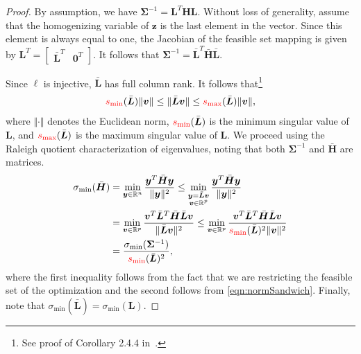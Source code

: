 \documentclass[lettersize,journal]{IEEEtran}
\newcommand{\rev}[1]{\color{red}{#1}\color{black}}
\begin{document}
\begin{proof}
By assumption, we have $\bm{\Sigma}^{-1} = \bm{L}^T\bm{H}\bm{L}$. Without loss of generality, assume that the homogenizing variable of $\bm{z}$ is the last element in the vector. Since this element is always equal to one, the Jacobian of the feasible set mapping is given by $\bm{L}^T = \begin{bmatrix}
	\bar{\bm{L}}^T & \bm{0}^T
\end{bmatrix}$. It follows that $\bm{\Sigma}^{-1} = \bar{\bm{L}}^T\bar{\bm{H}}\bar{\bm{L}}$.

Since $\bm{\ell}$ is injective, $\bar{\bm{L}}$ has full column rank. It follows that\footnote{See proof of Corollary 2.4.4 in~\cite{golubMatrixComputations2013}.}
\begin{equation}\label{eqn:normSandwich}
	\rev{s_{\min}}(\bar{\bm{L}}) \Vert\bm{v}\Vert \leq  \Vert\bar{\bm{L}}\bm{v}\Vert \leq \rev{s_{\max}}(\bar{\bm{L}})\Vert\bm{v}\Vert,
\end{equation}
where $\Vert\cdot\Vert$ denotes the Euclidean norm, $\rev{s_{\min}}(\bar{\bm{L}})$ is the minimum singular value of $\bm{L}$, and $\rev{s_{\max}}(\bar{\bm{L}})$ is the maximum singular value of $\bm{L}$. We proceed using the Raleigh quotient characterization of eigenvalues, noting that both $\bm{\Sigma}^{-1}$ and $\bar{\bm{H}}$ are \rev{real, symmetric } matrices.
\begin{align*}
	\sigma_{\min}(\bar{\bm{H}}) &= \min\limits_{\bm{y}\in\mathbb{R}^n} \frac{\bm{y}^T \bar{\bm{H}} \bm{y}}{\Vert\bm{y}\Vert^2} 
	\leq \min\limits_{\substack{\bm{y}=\bar{\bm{L}}\bm{v}\\\bm{v}\in\mathbb{R}^p}} \frac{\bm{y}^T \bar{\bm{H}} \bm{y}}{\Vert\bm{y}\Vert^2} \\&= \min\limits_{\bm{v}\in\mathbb{R}^p} \frac{\bm{v}^T \bar{\bm{L}}^T\bar{\bm{H}}\bar{\bm{L}} \bm{v}}{\Vert\bar{\bm{L}}\bm{v}\Vert^2 }  
	\leq \min\limits_{\bm{v}\in\mathbb{R}^p} \frac{\bm{v}^T \bar{\bm{L}}^T\bar{\bm{H}}\bar{\bm{L}} \bm{v}}{\rev{s_{\min}}(\bar{\bm{L}})^2\Vert\bm{v}\Vert^2 } 
	\\&= \frac{\sigma_{\min}(\bm{\Sigma}^{-1})}{\rev{s_{\min}}(\bar{\bm{L}})^2},
\end{align*}
where the first inequality follows from the fact that we are restricting the feasible set of the optimization and the second follows from \eqref{eqn:normSandwich}. Finally, note that $\sigma_{\min}(\bar{\bm{L}}) = \sigma_{\min}(\bm{L})$.

\end{proof}
\end{document}

